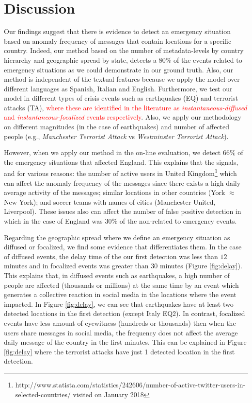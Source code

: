 \documentclass[sigconf]{acmart}
\begin{document}
\section{Discussion}

Our findings suggest that there is evidence to detect an emergency situation based on anomaly frequency of messages that contain locations for a specific country. Indeed, our method based on the number of metadata-levels by country hierarchy and geographic spread by state, detects a $80\%$ of the events related to emergency situations as we could demonstrate in our ground truth. Also, our method is independent of the textual features because we apply the model over different languages as Spanish, Italian and English. Furthermore, we test our model in different types of crisis events such as earthquakes (EQ) and terrorist attacks (TA), \textcolor{red}{ where these are identified in the literature as \textit{instantaneous-diffused} and \textit{instantaneous-focalized} events respectively}. Also, we apply our methodology on different magnitudes (in the case of earthquakes) and number of affected people (e.g., \textit{Manchester Terrorist Attack} vs \textit{Westminster Terrorist Attack}).

However, when we apply our method in the on-line evaluation, we detect $66\%$ of the emergency situations that affected England. This explains that the signals, and for various reasons: the number of active users in United Kingdom\footnote{http://www.statista.com/statistics/242606/number-of-active-twitter-users-in-selected-countries/ visited on January 2018} which can affect the anomaly frequency of the messages since there exists a high daily average activity of the messages; similar locations in other countries (York $\approx$ New York); and soccer teams with names of cities (Manchester United, Liverpool). These issues also can affect the number of false positive detection in which in the case of England was $30\%$ of the non-related to emergency events.

Regarding the geographic spread where we define an emergency situation as diffused or focalized, we find some evidence that differentiates them. In the case of diffused events, the delay time of the our first detection was less than $12$ minutes and in focalized events was greater than $30$ minutes (Figure \ref{fig:delay}). This explains that, in diffused events such as earthquakes, a high number of people are affected (thousands or millions) at the same time by an event which generates a collective reaction in social media in the locations where the event impacted. In Figure \ref{fig:delay}, we can see that earthquakes have at least two detected locations in the first detection (except Italy EQ2). In contrast, focalized events have less amount of eyewitness (hundreds or thousands) then when the users share messages in social media, the frequency does not affect the average daily message of the country in the first minutes. This can be explained in Figure \ref{fig:delay} where the terrorist attacks have just 1 detected location in the first detection.
\end{document}
